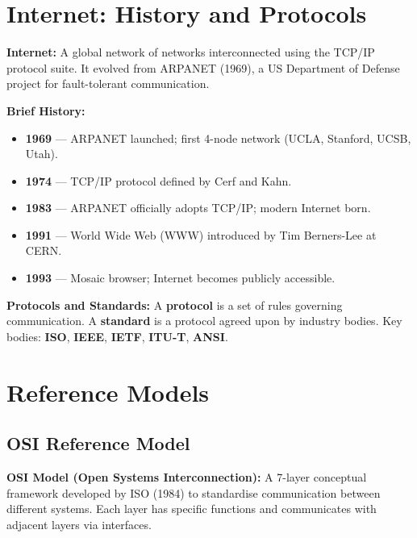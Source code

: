 \documentclass[12pt,a4paper]{article}
\begin{document}
\section{Internet: History and Protocols}

\begin{tcolorbox}[defbox]
\textbf{Internet:} A global network of networks interconnected using the TCP/IP protocol suite. It evolved from ARPANET (1969), a US Department of Defense project for fault-tolerant communication.
\end{tcolorbox}

\textbf{Brief History:}
\begin{itemize}[leftmargin=*, itemsep=3pt]
  \item \textbf{1969} --- ARPANET launched; first 4-node network (UCLA, Stanford, UCSB, Utah).
  \item \textbf{1974} --- TCP/IP protocol defined by Cerf and Kahn.
  \item \textbf{1983} --- ARPANET officially adopts TCP/IP; modern Internet born.
  \item \textbf{1991} --- World Wide Web (WWW) introduced by Tim Berners-Lee at CERN.
  \item \textbf{1993} --- Mosaic browser; Internet becomes publicly accessible.
\end{itemize}

\textbf{Protocols and Standards:} A \textbf{protocol} is a set of rules governing communication. A \textbf{standard} is a protocol agreed upon by industry bodies. Key bodies: \textbf{ISO}, \textbf{IEEE}, \textbf{IETF}, \textbf{ITU-T}, \textbf{ANSI}.

\section{Reference Models}

\subsection{OSI Reference Model}

\begin{tcolorbox}[defbox]
\textbf{OSI Model (Open Systems Interconnection):} A 7-layer conceptual framework developed by ISO (1984) to standardise communication between different systems. Each layer has specific functions and communicates with adjacent layers via interfaces.
\end{tcolorbox}
\end{document}
